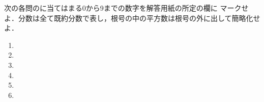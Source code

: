 \documentclass[../../../uem_mat_mei_q.tex]{subfiles}
\begin{document}
    次の各問の\:\myboxb{　　　}\:に当てはまる0から9までの数字を解答用紙の所定の欄に%
    マークせよ．分数は全て既約分数で表し，根号の中の平方数は根号の外に出して簡略化せよ．
    
    \begin{enumerate}
        \item 
        \item 
        \newpage
        \item 
        \item 
        \newpage
        \item 
        \item 
    \end{enumerate}
\end{document}
